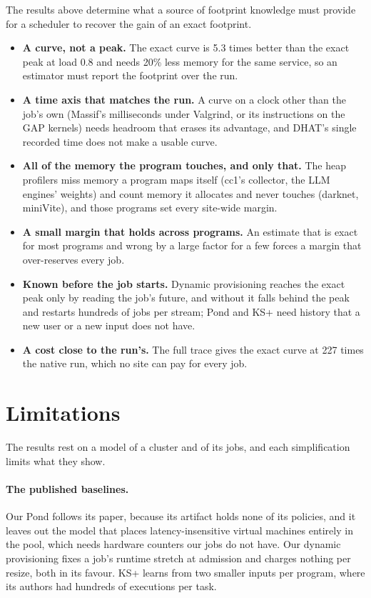 \documentclass[11pt]{article}
\begin{document}
The results above determine what a source of footprint knowledge must provide for a scheduler to recover the gain of an
exact footprint.
\begin{itemize}
  \item \textbf{A curve, not a peak.} The exact curve is 5.3 times better than the exact peak at load 0.8 and needs 20\% less
    memory for the same service, so an estimator must report the footprint over the run.
  \item \textbf{A time axis that matches the run.} A curve on a clock other than the job's own (Massif's milliseconds under
    Valgrind, or its instructions on the GAP kernels) needs headroom that erases its advantage, and DHAT's single recorded
    time does not make a usable curve.
  \item \textbf{All of the memory the program touches, and only that.} The heap profilers miss memory a program maps itself
    (cc1's collector, the LLM engines' weights) and count memory it allocates and never touches (darknet, miniVite), and
    those programs set every site-wide margin.
  \item \textbf{A small margin that holds across programs.} An estimate that is exact for most programs and wrong by a large
    factor for a few forces a margin that over-reserves every job.
  \item \textbf{Known before the job starts.} Dynamic provisioning reaches the exact peak only by reading the job's future, and
    without it falls behind the peak and restarts hundreds of jobs per stream; Pond and KS+ need history that a new user or
    a new input does not have.
  \item \textbf{A cost close to the run's.} The full trace gives the exact curve at 227 times the native run, which no site can
    pay for every job.
\end{itemize}

\section{Limitations}
\label{sec:limits}

The results rest on a model of a cluster and of its jobs, and each simplification limits what they show.

\paragraph{The published baselines.} Our Pond follows its paper, because its artifact holds none of its policies, and it
leaves out the model that places latency-insensitive virtual machines entirely in the pool, which needs hardware counters our
jobs do not have. Our dynamic provisioning fixes a job's runtime stretch at admission and charges nothing per resize, both in
its favour. KS+ learns from two smaller inputs per program, where its authors had hundreds of executions per task.
\end{document}
